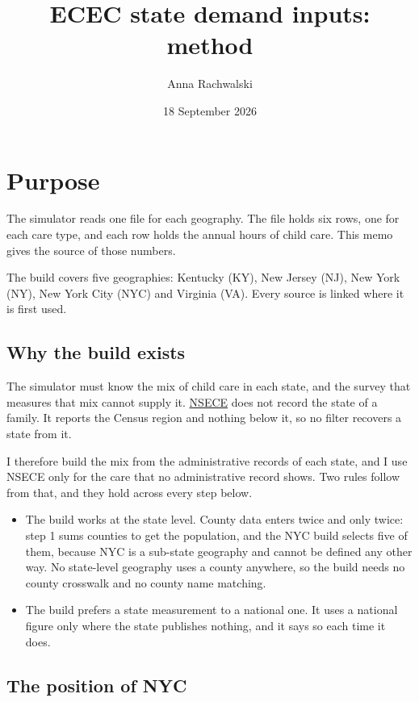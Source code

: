 \documentclass[11pt]{article}
\title{ECEC state demand inputs: method}
\author{Anna Rachwalski}
\date{18 September 2026}
\begin{document}
\maketitle

\section{Purpose}

The simulator reads one file for each geography. The file holds six rows, one
for each care type, and each row holds the annual hours of child care. This memo
gives the source of those numbers.

The build covers five geographies: Kentucky (KY), New Jersey (NJ), New York
(NY), New York City (NYC) and Virginia (VA). Every source is linked where it is
first used.

\subsection*{Why the build exists}

The simulator must know the mix of child care in each state, and the survey that
measures that mix cannot supply it.
\href{https://www.icpsr.umich.edu/web/ICPSR/studies/37941}{NSECE} does not record
the state of a family. It reports the Census region and nothing below it, so no
filter recovers a state from it.

I therefore build the mix from the administrative records of each state, and I
use NSECE only for the care that no administrative record shows. Two rules
follow from that, and they hold across every step below.

\begin{itemize}
\setlength{\itemsep}{0.45em}
\item The build works at the state level. County data enters twice and only
      twice: step 1 sums counties to get the population, and the NYC build
      selects five of them, because NYC is a sub-state geography and cannot be
      defined any other way. No state-level geography uses a county anywhere, so
      the build needs no county crosswalk and no county name matching.
\item The build prefers a state measurement to a national one. It uses a
      national figure only where the state publishes nothing, and it says so
      each time it does.
\end{itemize}

\subsection*{The position of NYC}
\end{document}
